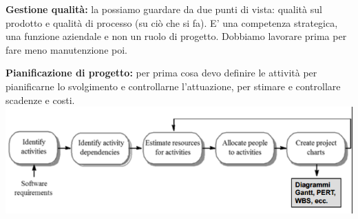 \textbf{Gestione qualità:} la possiamo guardare da due punti di vista: qualità sul prodotto e qualità di processo (su ciò che si fa). E' una competenza strategica, una funzione aziendale e non un ruolo di progetto. Dobbiamo lavorare prima per fare meno manutenzione poi.

\textbf{Pianificazione di progetto:} per prima cosa devo definire le attività per pianificarne lo svolgimento e controllarne l'attuazione, per stimare e controllare scadenze e costi.
\\
\includegraphics[width=0.75\columnwidth]{img8}

